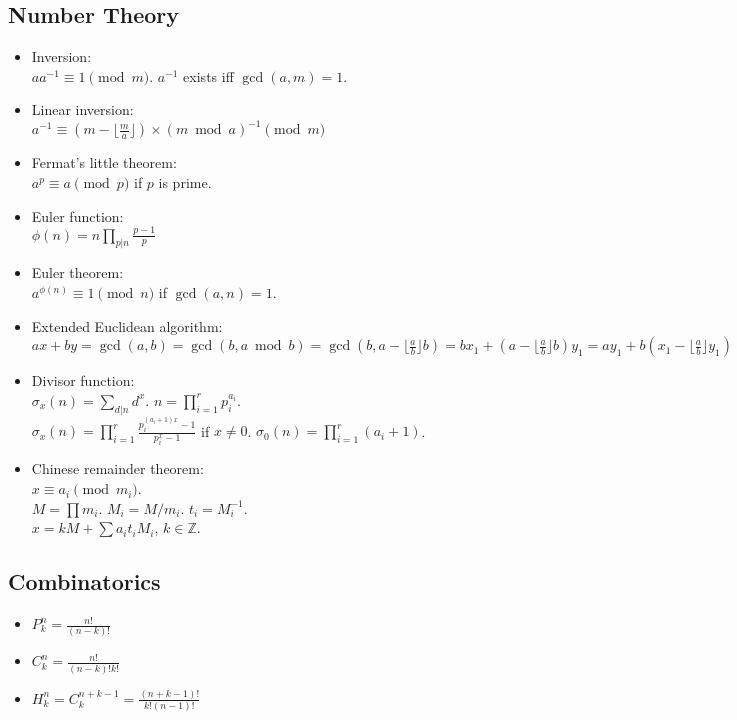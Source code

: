 \documentclass[twocolumn]{article}
\begin{document}
\subsection{Number Theory}

\begin{itemize}
    \item Inversion:\\ $aa^{-1} \equiv 1 \pmod{m}$. $a^{-1}$ exists iff $\gcd(a,m)=1$.
    \item Linear inversion:\\ $a^{-1} \equiv (m - \lfloor\frac{m}{a}\rfloor) \times (m \bmod a)^{-1} \pmod{m}$
    \item Fermat's little theorem:\\ $a^p \equiv a \pmod{p}$ if $p$ is prime.
    \item Euler function:\\ $\phi(n)=n \prod_{p|n} \frac{p-1}{p}$
    \item Euler theorem:\\ $a^{\phi(n)} \equiv 1 \pmod{n}$ if $\gcd(a,n) = 1$.
    \item Extended Euclidean algorithm:\\
    $ax+by=\gcd(a,b)=\gcd(b, a \bmod b)=\gcd(b, a-\lfloor\frac{a}{b}\rfloor b)=bx_1+(a-\lfloor\frac{a}{b}\rfloor b)y_1=ay_1+b(x_1-\lfloor\frac{a}{b}\rfloor y_1)$
    \item Divisor function:\\ $\sigma_x(n) = \sum_{d|n}d^x$. $n=\prod_{i=1}^r p_i^{a_i}$.\\ $\sigma_x(n)=\prod_{i=1}^r \frac{p_i^{(a_i+1)x}-1}{p_i^x-1}$ if $x \neq 0$. $\sigma_0(n)=\prod_{i=1}^r (a_i+1)$.
    \item Chinese remainder theorem:\\ $x \equiv a_i \pmod{m_i}$.\\
        $M=\prod m_i$. $M_i=M/m_i$. $t_i=M_i^{-1}$.\\
        $x = kM + \sum a_i t_i M_i$, $k \in \mathbb{Z}$.
\end{itemize}

\subsection{Combinatorics}

\begin{itemize}
    \item $P^n_k=\frac{n!}{(n-k)!}$
    \item $C^n_k=\frac{n!}{(n-k)!k!}$
    \item $H^n_k=C^{n+k-1}_k=\frac{(n+k-1)!}{k!(n-1)!}$
\end{itemize}
\end{document}
